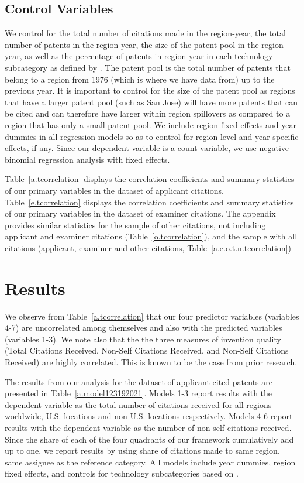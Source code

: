 \documentclass[12pt,letterpaper]{article}
\begin{document}
\subsection{Control Variables}
We control for the total number of citations made in the region-year, the total number of patents in the region-year, the size of the patent pool in the region-year, as well as the percentage of patents in region-year in each technology subcategory as defined by \cite*{Hall2001a}. The patent pool is the total number of patents that belong to a region from 1976 (which is where we have data from) up to the previous year. It is important to control for the size of the patent pool as  regions that have a larger patent pool (such as San Jose) will have more patents that can be cited and can therefore have larger within region spillovers as compared to a region that has only a small patent pool. We include region fixed effects and year dummies in all regression models so as to control for region level and year specific effects, if any. Since our dependent variable is a count variable, we use negative binomial regression analysis with fixed effects. \par

Table~\ref{a.tcorrelation} displays the correlation coefficients and summary statistics of our primary variables in the dataset of applicant  citations. Table~\ref{e.tcorrelation} displays the correlation coefficients and summary statistics of our primary variables in the dataset of examiner  citations. The appendix provides similar statistics for the sample of other citations, not including applicant and examiner citations (Table~\ref{o.tcorrelation}), and the sample with all citations (applicant, examiner and other citations, Table~\ref{a.e.o.t.n.tcorrelation})



\section{Results}
We observe from Table~\ref{a.tcorrelation} that our four predictor variables (variables 4-7) are uncorrelated among themselves and also with the predicted variables (variables 1-3). We note also that the the three measures of invention quality (Total Citations Received, Non-Self Citations Received, and Non-Self Citations Received) are highly correlated. This is known to be the case from prior research. \par

The  results from our analysis for the dataset of applicant  cited patents are presented in Table~\ref{a.model123192021}. Models 1-3 report results with the dependent variable as the total number of citations received for all regions worldwide, U.S. locations and non-U.S. locations respectively. Models 4-6 report results with the dependent variable as the number of non-self citations received. Since the share of each of the four quadrants of our framework cumulatively add up to one, we report results by using share of citations made to same region, same assignee as the reference category. All models include year dummies, region fixed effects, and controls for technology subcategories based on \cite*{Hall2001a}. \par
\end{document}
